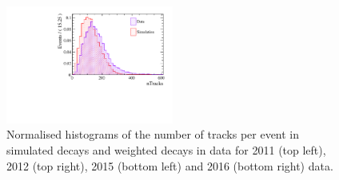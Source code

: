 \begin{figure}[htbp]
    \includegraphics[width=0.49\textwidth]{./Figs/LifetimeMeasurement/Bd2KPi_2016_data_MC_nTracks.pdf}
  \caption{Normalised histograms of the number of tracks per event in simulated \bdkpi decays and weighted \bdkpi decays in data for 2011 (top left), 2012 (top right), 2015 (bottom left) and 2016 (bottom right) data. }
  \label{fig:nTracksMCDataComp}
\end{figure}
\FloatBarrier
